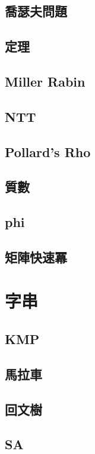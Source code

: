 \documentclass[a4paper,10pt,twocolumn,oneside]{article}
\begin{document}
\subsection{喬瑟夫問題}

\subsection{定理}

\subsection{Miller Rabin}

\subsection{NTT}

\subsection{Pollard's Rho}

\subsection{質數}

\subsection{phi}

\subsection{矩陣快速冪}

\section{字串}
\subsection{KMP}

\subsection{馬拉車}

\subsection{回文樹}

\subsection{SA}

\end{document}
